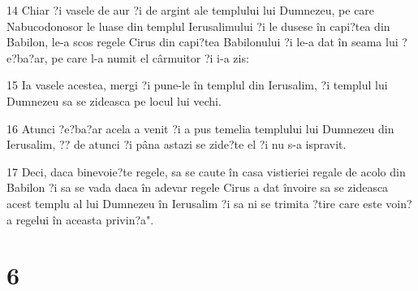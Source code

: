 \par 14 Chiar ?i vasele de aur ?i de argint ale templului lui Dumnezeu, pe care Nabucodonosor le luase din templul Ierusalimului ?i le dusese în capi?tea din Babilon, le-a scos regele Cirus din capi?tea Babilonului ?i le-a dat în seama lui ?e?ba?ar, pe care l-a numit el cârmuitor ?i i-a zis:
\par 15 Ia vasele acestea, mergi ?i pune-le în templul din Ierusalim, ?i templul lui Dumnezeu sa se zideasca pe locul lui vechi.
\par 16 Atunci ?e?ba?ar acela a venit ?i a pus temelia templului lui Dumnezeu din Ierusalim, ?? de atunci ?i pâna astazi se zide?te el ?i nu s-a ispravit.
\par 17 Deci, daca binevoie?te regele, sa se caute în casa vistieriei regale de acolo din Babilon ?i sa se vada daca în adevar regele Cirus a dat învoire sa se zideasca acest templu al lui Dumnezeu în Ierusalim ?i sa ni se trimita ?tire care este voin?a regelui în aceasta privin?a".

\chapter{6}

